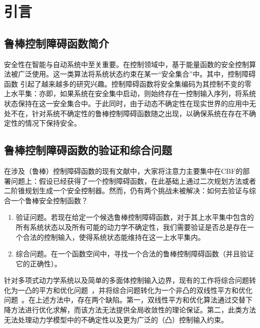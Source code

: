 
\chapter{引言}

\section{鲁棒控制障碍函数简介}
安全性在智能与自动系统中至关重要。在控制领域中，基于能量函数的安全控制算法被广泛使用。这一类算法将系统状态约束在某一“安全集合”中。其中，控制障碍函数\cite{ames2014cdc-cbforigin} 引起了越来越多的研究兴趣。控制障碍函数将安全集编码为其控制不变的零上水平集：亦即，如果系统在安全集中启动，则始终存在一控制输入序列，将系统状态保持在这一安全集合中。于此同时，由于动态不确定性在现实世界的应用中无处不在，针对系统不确定性的鲁棒控制障碍函数随之出现，以确保系统在存在不确定性的情况下保持安全。

\section{鲁棒控制障碍函数的验证和综合问题}
在涉及（鲁棒）控制障碍函数的现有文献中，大家将注意力主要集中在CBF的部署问题上：假设已经获得了一个控制障碍函数，在此基础上通过二次规划方法\cite{taylor2020acc-robustqp}或者二阶锥规划\cite{buch21csl-robust}生成一个安全控制器。然而，仍有两个挑战未被解决：如何去验证与综合一个鲁棒安全控制函数？
\begin{enumerate}
    \item 验证问题。若现在给定一个候选鲁棒控制障碍函数，对于其上水平集中包含的所有系统状态以及所有可能的动力学不确定性，我们需要验证是否总是存在一个合法的控制输入，使得系统状态能维持在这一上水平集内。
    \item 综合问题。在一个函数空间中，寻找一个合法的鲁棒控制障碍函数（并且验证它的正确性）。
\end{enumerate}

针对多项式动力学系统以及简单的多面体控制输入边界，现有的工作将综合问题转化为一凸的平方和优化问题~\cite{clark22arxiv-cbf,dai2022arxiv-clfcbfsynveri}，并将综合问题转化为一个非凸的双线性平方和优化问题~\cite{wang2018acc-permissive,zhao22arxiv-cbfsos}。在上述方法中，存在两个缺陷。第一，双线性平方和优化算法通过交替下降方法进行优化求解，而该方法无法提供全局收敛性的理论保证。第二，此类方法无法处理动力学模型中的不确定性以及更为广泛的（凸）控制输入约束。

